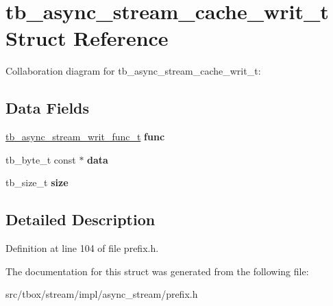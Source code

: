 \hypertarget{structtb__async__stream__cache__writ__t}{\section{tb\-\_\-async\-\_\-stream\-\_\-cache\-\_\-writ\-\_\-t Struct Reference}
\label{structtb__async__stream__cache__writ__t}
}


Collaboration diagram for tb\-\_\-async\-\_\-stream\-\_\-cache\-\_\-writ\-\_\-t\-:
\subsection*{Data Fields}
\begin{DoxyCompactItemize}
\item 
\hypertarget{structtb__async__stream__cache__writ__t_aa1f9b82bb1e94338304da09ae61ff504}{\hyperlink{async__stream_8h_a388210c1b03dbf28cf3f47f26449beb5}{tb\-\_\-async\-\_\-stream\-\_\-writ\-\_\-func\-\_\-t} {\bfseries func}}\label{structtb__async__stream__cache__writ__t_aa1f9b82bb1e94338304da09ae61ff504}

\item 
\hypertarget{structtb__async__stream__cache__writ__t_a19ac2c25c847f34bba4c6a9778b48f88}{tb\-\_\-byte\-\_\-t const $\ast$ {\bfseries data}}\label{structtb__async__stream__cache__writ__t_a19ac2c25c847f34bba4c6a9778b48f88}

\item 
\hypertarget{structtb__async__stream__cache__writ__t_a7d06547896dc0dbfad630613b3a0f64e}{tb\-\_\-size\-\_\-t {\bfseries size}}\label{structtb__async__stream__cache__writ__t_a7d06547896dc0dbfad630613b3a0f64e}

\end{DoxyCompactItemize}


\subsection{Detailed Description}


Definition at line 104 of file prefix.\-h.



The documentation for this struct was generated from the following file\-:\begin{DoxyCompactItemize}
\item 
src/tbox/stream/impl/async\-\_\-stream/prefix.\-h\end{DoxyCompactItemize}
